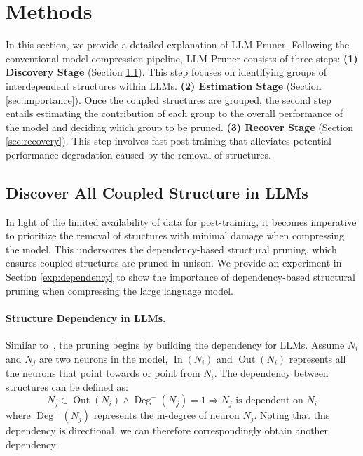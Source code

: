 \section{Methods}
In this section, we provide a detailed explanation of LLM-Pruner. Following the conventional model compression pipeline\cite{kwon2022fast}, LLM-Pruner consists of  three steps:
\textbf{(1) Discovery Stage} (Section \ref{sec:dependency}). This step focuses on identifying groups of interdependent structures within LLMs. 
\textbf{(2) Estimation Stage} (Section \ref{sec:importance}). Once the coupled structures are grouped, the second step entails estimating the contribution of each group to the overall performance of the model and deciding which group to be pruned.
\textbf{(3) Recover Stage} (Section \ref{sec:recovery}). This step involves fast post-training that alleviates potential performance degradation caused by the removal of structures.  

\subsection{Discover All Coupled Structure in LLMs} \label{sec:dependency}

In light of the limited availability of data for post-training, it becomes imperative to prioritize the removal of structures with minimal damage when compressing the model. This underscores the dependency-based structural pruning, which ensures coupled structures are pruned in unison. We provide an experiment in Section \ref{exp:dependency} to show the importance of dependency-based structural pruning when compressing the large language model.

\paragraph{Structure Dependency in LLMs.} Similar to~\cite{fang2023depgraph}, the pruning begins by building the dependency for LLMs. Assume $N_i$ and $N_j$ are two neurons in the model, $\operatorname{In}(N_i)$ and $\operatorname{Out}(N_i)$ represents all the neurons that point towards or point from $N_i$. The dependency between structures can be defined as:
\begin{equation}
     N_j \in \operatorname{Out}(N_i) \wedge \operatorname{Deg}^-(N_j) = 1 \Rightarrow N_j \text{ is dependent on } N_i
\end{equation}
where $\operatorname{Deg}^-(N_j)$ represents the in-degree of neuron $N_j$. Noting that this dependency is directional, we can therefore correspondingly obtain another dependency:

